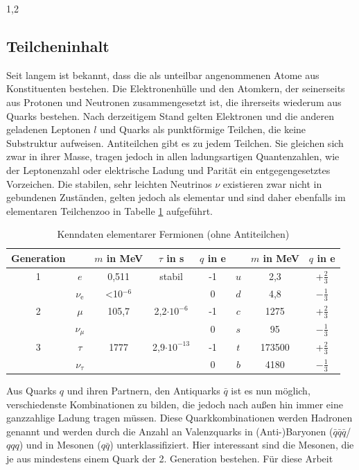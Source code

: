 \documentclass[11pt,a4paper,twoside]{report}
\begin{document}
\begin{spacing}{1,2}
\subsection{Teilcheninhalt}
Seit langem ist bekannt, dass die als unteilbar angenommenen Atome aus Konstituenten bestehen. Die Elektronenhülle und den Atomkern, der seinerseits aus
Protonen und Neutronen zusammengesetzt ist, die ihrerseits wiederum aus Quarks bestehen. Nach derzeitigem Stand gelten Elektronen und die anderen geladenen 
Leptonen $l$ und Quarks als punktförmige
Teilchen, die keine Substruktur aufweisen. Antiteilchen gibt es zu jedem Teilchen. Sie gleichen sich zwar in ihrer Masse, tragen jedoch in allen ladungsartigen Quantenzahlen, wie der Leptonenzahl oder
elektrische Ladung und Parität ein entgegengesetztes Vorzeichen. Die stabilen, sehr leichten Neutrinos $\nu$ existieren zwar nicht in gebundenen Zuständen, gelten jedoch als elementar und sind daher 
ebenfalls im elementaren Teilchenzoo \cite{PDG} in Tabelle \ref{tab_particlezoo} aufgeführt.
\begin{table}[H]
\begin{tabular}{c|cccc|ccc} \toprule 
 Generation & & $m$ in MeV & $\tau$ in s & $q$ in e & & $m$ in MeV & $q$ in e\\
 \midrule
  1 & $e$ & 0,511 & stabil & -1 & $u$ & 2,3 & +$\frac23$\\
  &$\nu_\text{e}$& <10$^{-6}$ &  & 0 & $d$ & 4,8 & $-\frac13$\\
  2 & $\mu$ & 105,7 & 2,2$\cdot 10^{-6}$ & -1 & $c$ &1275& +$\frac23$\\
  &$\nu_\mu$ & & & 0 & $s$ &95& $-\frac13$\\
  3& $\tau$ &1777& 2,9$\cdot 10^{-13}$ & -1 & $t$ & 173500 & +$\frac23$\\
  &$\nu_\tau$& & & 0 & $b$ &4180 & $-\frac13$
\\\bottomrule \bottomrule
 \end{tabular}
\caption{Kenndaten elementarer Fermionen (ohne Antiteilchen)}
\label{tab_particlezoo}
\end{table}
\noindent
Aus Quarks $q$ und ihren Partnern, den Antiquarks $\bar q$ ist es nun möglich, verschiedenste Kombinationen zu bilden, die jedoch nach außen hin immer eine
ganzzahlige Ladung tragen müssen. Diese Quarkkombinationen werden Hadronen genannt und werden durch die Anzahl an Valenzquarks in (Anti-)Baryonen ($\bar q\bar q\bar q$/$qqq$) und in 
Mesonen ($q\bar q$) unterklassifiziert. Hier interessant sind die Mesonen, die je aus mindestens einem Quark der 2. Generation bestehen. Für diese Arbeit

\end{spacing}
\end{document}
